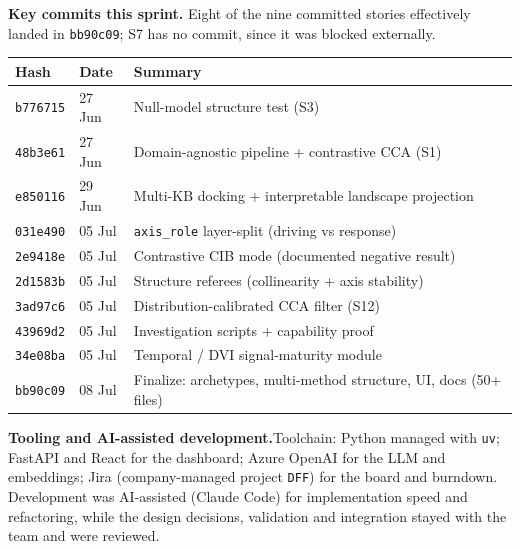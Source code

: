 \documentclass[11pt,a4paper]{article}
\newcommand{\note}[2]{\par\smallskip\noindent\textbf{#1.}\enspace #2\par\smallskip}
\newcommand{\tipb}[2]{\note{#1}{#2}}
\newcommand{\code}[1]{\texttt{\small #1}}
\begin{document}
\textbf{Key commits this sprint.} Eight of the nine committed stories effectively landed in \code{bb90c09};
S7 has no commit, since it was blocked externally.

\begin{center}\small
\begin{tabular}{@{}lll@{}}
\toprule
\textbf{Hash} & \textbf{Date} & \textbf{Summary} \\
\midrule
\code{b776715} & 27 Jun & Null-model structure test (S3) \\
\code{48b3e61} & 27 Jun & Domain-agnostic pipeline + contrastive CCA (S1) \\
\code{e850116} & 29 Jun & Multi-KB docking + interpretable landscape projection \\
\code{031e490} & 05 Jul & \code{axis\_role} layer-split (driving vs response) \\
\code{2e9418e} & 05 Jul & Contrastive CIB mode (documented negative result) \\
\code{2d1583b} & 05 Jul & Structure referees (collinearity + axis stability) \\
\code{3ad97c6} & 05 Jul & Distribution-calibrated CCA filter (S12) \\
\code{43969d2} & 05 Jul & Investigation scripts + capability proof \\
\code{34e08ba} & 05 Jul & Temporal / DVI signal-maturity module \\
\code{bb90c09} & 08 Jul & Finalize: archetypes, multi-method structure, UI, docs (50+ files) \\
\bottomrule
\end{tabular}
\end{center}

\tipb{Tooling and AI-assisted development}{Toolchain: Python managed with \code{uv}; FastAPI and React for
the dashboard; Azure OpenAI for the LLM and embeddings; Jira (company-managed project \code{DFF}) for the
board and burndown. Development was AI-assisted (Claude Code) for implementation speed and refactoring,
while the design decisions, validation and integration stayed with the team and were reviewed.}

\end{document}
